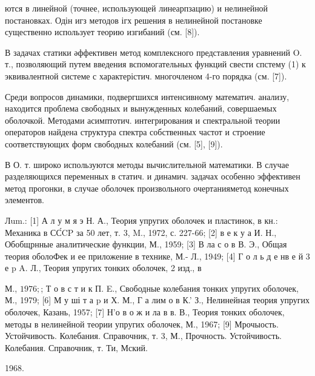 \documentclass[10pt]{article}
\begin{document}
ются в линейной (точнее, использующей линеарпзацию) и нелинейной постановках. Одін игз методов ігх решения в нелинейной постановке существенно использует теорию изгибаний (см. [8]).



В задачах статики әффективен метод комплексного представления уравнений $\mathrm{O}$. т., позволяющий путем введения вспомогательных функций свести спстему (1) к эквивалентной системе с характерістич. многочленом 4-го порядка (см. [7]).



Среди вопросов динамики, подвергшихся интенсивному математич. анализу, находится проблема свободных и вынужденных колебаний, совершаемых оболочкой. Методами асимптотич. интегрирования и спектральной теории операторов найдена структура спектра собственных частот и строение соответствующих форм свободных колебаний (см. [5], [9]).



В О. т. широко используются методы вычислительной математики. В случае разделяющихся переменных в статич. и динамич. задачах особенно эффективен метод прогонки, в случае оболочек произвольного очертанияметод конечных элементов.



Лum.: [1] А л у м я э Н. А., Теория упругих оболочек и пластинок, в кн.: Механика в СС́CP за 50 лет, т. 3, M., 1972, с. 227-66; [2] в е к у а И. Н., Обобщрнные аналитические функции, М., 1959; [3] В ла с о в В. Э., Общая теория оболоФек и ее приложение в технике, М.- Л., 1949; [4] Г о л ь д е нв е й 3 е p A. Л., Теория упругих тонких оболочек, 2 изд., в

М., $1976 ;$; Т о в с т и к П. E., Свободные колебания тонких упругих оболочек, М., 1979; [6] М у ші т а p и Х. М., Г а лим о в К.' З., Нелинейная теория упругих оболочек, Казань, 1957; [7] Н'о в о ж и ла в в. В., Теория тонких оболочек, методы в нелинейной теории упругих оболочек, М., 1967; [9] Мрочыость. Устойчивость. Колебания. Справочник, т. 3, М., Прочность. Устойчивость. Колебания. Справочник, т. Ти, Мский.

1968.
\end{document}
